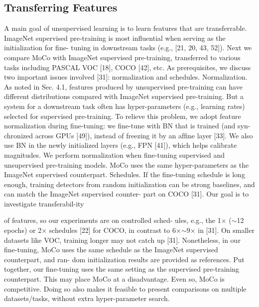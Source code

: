 \documentclass[10pt,twocolumn]{article}  %
\begin{document}
\subsection{Transferring Features}
A main goal of unsupervised learning is to learn features
that are transferrable. ImageNet supervised pre-training is
most inﬂuential when serving as the initialization for ﬁne-
tuning in downstream tasks (e.g., [21, 20, 43, 52]). Next
we compare MoCo with ImageNet supervised pre-training,
transferred to various tasks including PASCAL VOC [18],
COCO [42], etc. As prerequisites, we discuss two important
issues involved [31]: normalization and schedules.
Normalization. As noted in Sec. 4.1, features produced by
unsupervised pre-training can have different distributions
compared with ImageNet supervised pre-training. But a
system for a downstream task often has hyper-parameters
(e.g., learning rates) selected for supervised pre-training. To
relieve this problem, we adopt feature normalization during
ﬁne-tuning: we ﬁne-tune with BN that is trained (and syn-
chronized across GPUs [49]), instead of freezing it by an
afﬁne layer [33]. We also use BN in the newly initialized
layers (e.g., FPN [41]), which helps calibrate magnitudes.
We perform normalization when ﬁne-tuning supervised
and unsupervised pre-training models. MoCo uses the same
hyper-parameters as the ImageNet supervised counterpart.
Schedules. If the ﬁne-tuning schedule is long enough,
training detectors from random initialization can be strong
baselines, and can match the ImageNet supervised counter-
part on COCO [31]. Our goal is to investigate transferabil-ity


of features, so our experiments are on controlled sched-
ules, e.g., the 1$\times $ ($\sim $12 epochs) or 2$\times $ schedules [22] for
COCO, in contrast to 6$\times $$\sim $9$\times $ in [31]. On smaller datasets
like VOC, training longer may not catch up [31].
Nonetheless, in our ﬁne-tuning, MoCo uses the same
schedule as the ImageNet supervised counterpart, and ran-
dom initialization results are provided as references.
Put together, our ﬁne-tuning uses the same setting as the
supervised pre-training counterpart. This may place MoCo
at a disadvantage. Even so, MoCo is competitive. Doing so
also makes it feasible to present comparisons on multiple
datasets/tasks, without extra hyper-parameter search.
\end{document}
